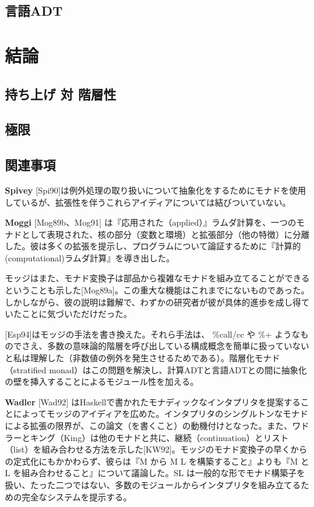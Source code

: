 \documentclass[11pt, oneside]{jsbook}   	%
\begin{document}
\section{ 言語ADT }


\newpage
\chapter{ 結論 }
\section{ 持ち上げ 対 階層性 }
\section{ 極限 }
\section{ 関連事項 }
{\bf Spivey} [Spi90]は例外処理の取り扱いについて抽象化をするためにモナドを使用しているが、拡張性を伴うこれらアイディアについては結びついていない。


{\bf Moggi} [Mog89b、Mog91] は『応用された（applied）』ラムダ計算を、一つのモナドとして表現された、核の部分（変数と環境）と拡張部分（他の特徴）に分離した。彼は多くの拡張を提示し、プログラムについて論証するために『計算的(computational)ラムダ計算』を導き出した。

モッジはまた、モナド変換子は部品から複雑なモナドを組み立てることができるということも示した[Mog89a]。この重大な機能はこれまでにないものであった。しかしながら、彼の説明は難解で、わずかの研究者が彼が具体的進歩を成し得ていたことに気づいただけだった。

[Esp94]はモッジの手法を書き換えた。それら手法は、 \%call/cc や \%+ ようなものでさえ、多数の意味論的階層を呼び出している構成概念を簡単に扱っていないと私は理解した（非数値の例外を発生させるためである）。階層化モナド（stratified monad）はこの問題を解決し、計算ADTと言語ADTとの間に抽象化の壁を挿入することによるモジュール性を加える。

{\bf Wadler} [Wad92] はHaskellで書かれたモナディックなインタプリタを提案することによってモッジのアイディアを広めた。インタプリタのシングルトンなモナドによる拡張の限界が、この論文（を書くこと）の動機付けとなった。また、ワドラーとキング（King）は他のモナドと共に、継続（continuation）とリスト（list）を組み合わせる方法を示した[KW92]。モッジのモナド変換子の早くからの定式化にもかかわらず、彼らは『M から M L を構築すること』よりも『M と L を組み合わせること』について議論した。SL は一般的な形でモナド構築子を扱い、たった二つではない、多数のモジュールからインタプリタを組み立てるための完全なシステムを提示する。
\end{document}
